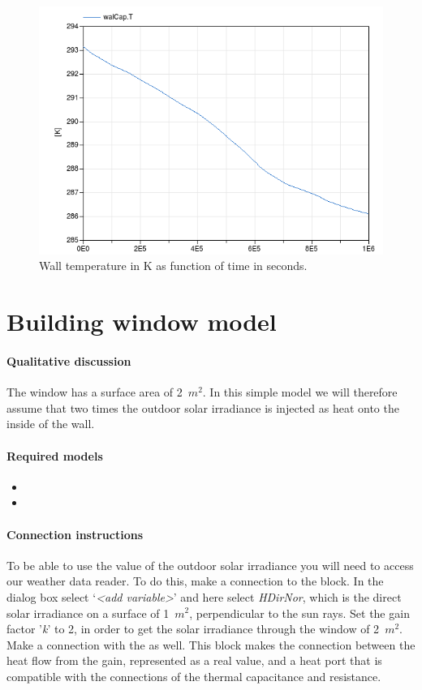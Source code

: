 \documentclass[10pt,a4paper]{article}
\begin{document}
\begin{figure}
\centering
\includegraphics[scale=0.6]{result1.png}
\caption{Wall temperature in K as function of time in seconds.}
\label{fig:res1}
\end{figure}


\section{Building window model}
\paragraph{Qualitative discussion}
The window has a surface area of 2~$m^2$. 
In this simple model we will therefore assume that two times the
outdoor solar irradiance is injected as heat onto the inside of the wall.

\paragraph{Required models}
\begin{itemize}
\item {}
\item {}
\end{itemize}

\paragraph{Connection instructions}
To be able to use the value of the outdoor solar irradiance
you will need to access our weather data reader.
To do this, make a connection to the  block. 
In the dialog box select `\textit{\textless add variable\textgreater}' and here
select \textit{HDirNor}, 
which is the direct solar irradiance on a surface
of 1~$m^2$, perpendicular to the sun rays. Set the gain factor '\textit{k}' to 2, in order to get the solar irradiance through the window of 2~$m^2$. Make a connection with the  as well. This block makes the connection between the heat flow from the gain, represented as a real value, and a heat port that is compatible with the connections of the thermal capacitance and resistance. 
\end{document}
